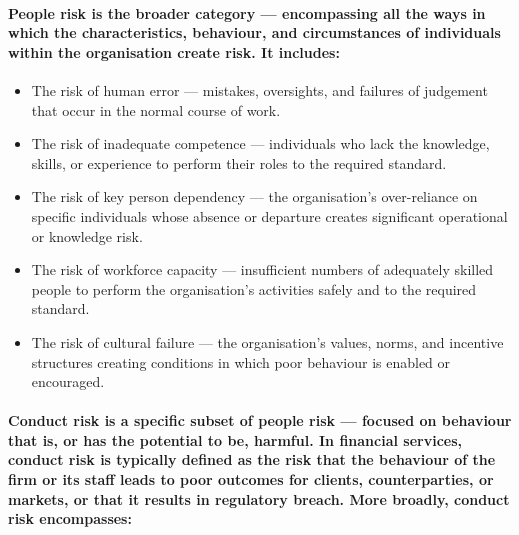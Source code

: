 \paragraph{\textbf{People risk} is the broader category — encompassing all the ways in which the characteristics, behaviour, and circumstances of individuals within the organisation create risk. It includes:}
\begin{itemize}
    \item{The risk of human error — mistakes, oversights, and failures of judgement that occur in the normal course of work.}
    \item{The risk of inadequate competence — individuals who lack the knowledge, skills, or experience to perform their roles to the required standard.}
    \item{The risk of key person dependency — the organisation's over-reliance on specific individuals whose absence or departure creates significant operational or knowledge risk.}
    \item{The risk of workforce capacity — insufficient numbers of adequately skilled people to perform the organisation's activities safely and to the required standard.}
    \item{The risk of cultural failure — the organisation's values, norms, and incentive structures creating conditions in which poor behaviour is enabled or encouraged.}
\end{itemize}
\paragraph{\textbf{Conduct risk} is a specific subset of people risk — focused on behaviour that is, or has the potential to be, harmful. In financial services, conduct risk is typically defined as the risk that the behaviour of the firm or its staff leads to poor outcomes for clients, counterparties, or markets, or that it results in regulatory breach. More broadly, conduct risk encompasses:}
\begin{itemize}
\end{itemize}
